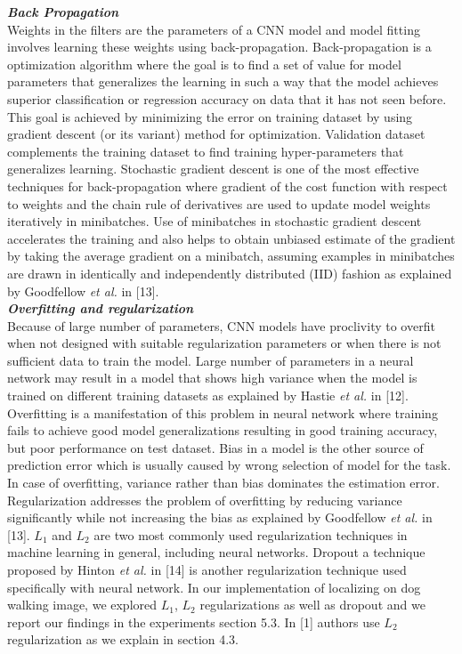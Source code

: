 \documentclass [11pt,letterpaper ,twoside ,openany ]{report}
\begin{document}
    \noindent
    \textbf{\textit{Back Propagation}}\\
    Weights in the filters are the parameters of a CNN model and model fitting involves learning these weights using back-propagation. Back-propagation is a optimization algorithm where the goal is to find a set of value for model parameters that generalizes the learning in such a way that the model achieves superior classification or regression accuracy on data that it has not seen before. This goal is achieved by minimizing the error on training dataset by using gradient descent (or its variant) method for optimization. Validation dataset complements the training dataset to find training hyper-parameters that generalizes learning. Stochastic gradient descent is one of the most effective techniques for back-propagation where gradient of the cost function with respect to weights and the chain rule of derivatives are used to update model weights iteratively in minibatches. Use of minibatches in stochastic gradient descent accelerates the training and also helps to obtain unbiased estimate of the gradient by taking the average gradient on a minibatch, assuming examples in minibatches are drawn in identically and independently distributed (IID) fashion as explained by Goodfellow \textit {et al.} in [13].\\

    \noindent
    \textbf{\textit{Overfitting and regularization}}\\
    Because of large number of parameters, CNN models have proclivity to overfit when not designed with suitable regularization parameters or when there is not sufficient data to train the model. Large number of parameters in a neural network may result in a model that shows high variance when the model is trained on different training datasets as explained by Hastie \textit {et al.} in [12]. Overfitting is a manifestation of this problem in neural network where training fails to achieve good model generalizations resulting in good training accuracy, but poor performance on test dataset. Bias in a model is the other source of prediction error which is usually caused by wrong selection of model for the task. In case of overfitting, variance rather than bias dominates the estimation error. Regularization addresses the problem of overfitting by reducing variance significantly while not increasing the bias as explained by Goodfellow \textit {et al.} in [13]. \(L_1\) and \(L_2\) are two most commonly used regularization techniques in machine learning in general, including neural networks. Dropout a technique proposed by Hinton \textit {et al.} in [14] is another regularization technique used specifically with neural network. In our implementation of localizing on dog walking image, we explored \(L_1\), \(L_2\) regularizations as well as dropout and we report our findings in the experiments section 5.3. In [1] authors use \(L_2\) regularization as we explain in section 4.3.
\end{document}
